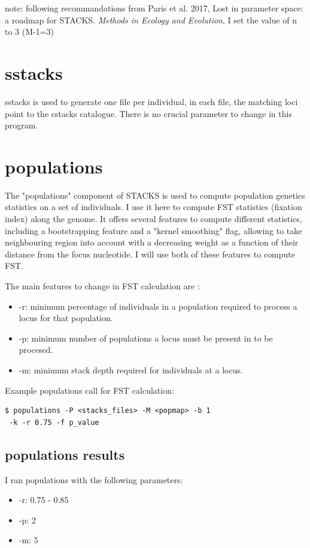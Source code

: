 \documentclass[10pt,a4paper]{report}
\begin{document}
note: following recommandations from Paris et al. 2017, Lost in parameter space: a roadmap for STACKS. \textit{Methods in Ecology and Evolution}, I set the value of n to 3 (M-1=3)

\section{sstacks}

sstacks is used to generate one file per individual, in each file, the matching loci point to the cstacks catalogue. There is no crucial parameter to change in this program.

\section{populations}

The "populations" component of STACKS is used to compute population genetics statistics on a set of individuals. I use it here to compute FST statistics (fixation index) along the genome. It offers several features to compute different statistics, including a bootstrapping feature and a "kernel smoothing" flag, allowing to take neighbouring region into account with a decreasing weight as a function of their distance from the focus nucleotide. I will use both of these features to compute FST.

The main features to change in FST calculation are :
\begin{itemize}
\item -r: minimum percentage of individuals in a population required to process a locus for that population.
\item -p: minimum number of populations a locus must be present in to be procesed.
\item -m: minimum stack depth required for individuals at a locus.
\end{itemize}

Example populations call for FST calculation:
\begin{lstlisting}
$ populations -P <stacks_files> -M <popmap> -b 1
 -k -r 0.75 -f p_value
\end{lstlisting}

\subsection{populations results}

I ran populations with the following parameters:
\begin{itemize}
\item -r: 0.75 - 0.85
\item -p: 2
\item -m: 5
\end{itemize}
\end{document}
